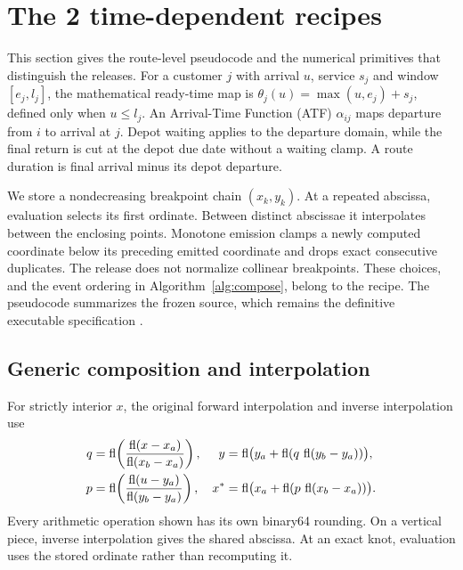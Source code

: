 \section{The 2 time-dependent recipes}\label{sec:recipes}

This section gives the route-level pseudocode and the numerical primitives that distinguish the releases. For a customer $j$ with arrival $u$, service $s_j$ and window $[e_j,l_j]$, the mathematical ready-time map is $\theta_j(u)=\max(u,e_j)+s_j$, defined only when $u\leq l_j$. An Arrival-Time Function (ATF) $\alpha_{ij}$ maps departure from $i$ to arrival at $j$. Depot waiting applies to the departure domain, while the final return is cut at the depot due date without a waiting clamp. A route duration is final arrival minus its depot departure.

We store a nondecreasing breakpoint chain $(x_k,y_k)$. At a repeated abscissa, evaluation selects its first ordinate. Between distinct abscissae it interpolates between the enclosing points. Monotone emission clamps a newly computed coordinate below its preceding emitted coordinate and drops exact consecutive duplicates. The release does not normalize collinear breakpoints. These choices, and the event ordering in Algorithm~\ref{alg:compose}, belong to the recipe. The pseudocode summarizes the frozen source, which remains the definitive executable specification \autocite{mamutChecker0112026,mamutChecker0122026}.

\subsection{Generic composition and interpolation}

For strictly interior $x$, the original forward interpolation and inverse interpolation use
\begin{align}
 q &= \operatorname{fl}\!\left(\frac{\operatorname{fl}(x-x_a)}{\operatorname{fl}(x_b-x_a)}\right), & y &= \operatorname{fl}\bigl(y_a+\operatorname{fl}(q\,\operatorname{fl}(y_b-y_a))\bigr),\\
 p &= \operatorname{fl}\!\left(\frac{\operatorname{fl}(u-y_a)}{\operatorname{fl}(y_b-y_a)}\right), & x^* &= \operatorname{fl}\bigl(x_a+\operatorname{fl}(p\,\operatorname{fl}(x_b-x_a))\bigr).
\end{align}
Every arithmetic operation shown has its own binary64 rounding. On a vertical piece, inverse interpolation gives the shared abscissa. At an exact knot, evaluation uses the stored ordinate rather than recomputing it.

